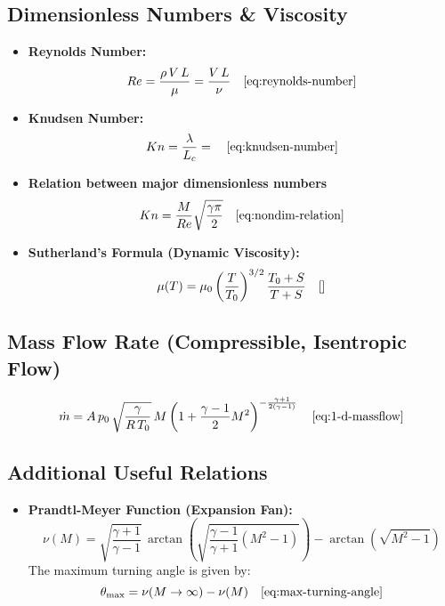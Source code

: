 \subsection*{Dimensionless Numbers \& Viscosity}
\begin{itemize}
    \item \textbf{Reynolds Number:}  
    $$
	    Re = \frac{\rho\,V\,L}{\mu} = \frac{V\,L}{\nu} \quad \eqref{eq:reynolds-number}
    $$
    \item \textbf{Knudsen Number:}  
    $$
	    Kn = \frac{\lambda}{L_c} = \quad \eqref{eq:knudsen-number}
    $$
	\item \textbf{Relation between major dimensionless numbers}
	$$
		Kn = \frac{M}{Re}\sqrt{\frac{\gamma \pi}{2}} \quad \eqref{eq:nondim-relation}
	$$
    \item \textbf{Sutherland’s Formula (Dynamic Viscosity):}  
    $$
	    \mu(T) = \mu_0\left(\frac{T}{T_0}\right)^{3/2}\frac{T_0+S}{T+S} \quad \eqref{}
    $$
\end{itemize}

\subsection*{Mass Flow Rate (Compressible, Isentropic Flow)}
$$
	\dot{m} = A\,p_0\,\sqrt{\frac{\gamma}{R\,T_0}}\,M\left(1+\frac{\gamma-1}{2}M^2\right)^{-\frac{\gamma+1}{2(\gamma-1)}} \quad \eqref{eq:1-d-massflow}
$$

\subsection*{Additional Useful Relations}
\begin{itemize}
    \item \textbf{Prandtl-Meyer Function (Expansion Fan):}  
    $$
    \nu(M) = \sqrt{\frac{\gamma+1}{\gamma-1}}\,\arctan\!\left(\sqrt{\frac{\gamma-1}{\gamma+1}(M^2-1)}\right) - \arctan\!\left(\sqrt{M^2-1}\right)
    $$
    The maximum turning angle is given by:
    $$
	    \theta_{\text{max}} = \nu(M\to\infty) - \nu(M) \quad \eqref{eq:max-turning-angle}
    $$
\end{itemize}
